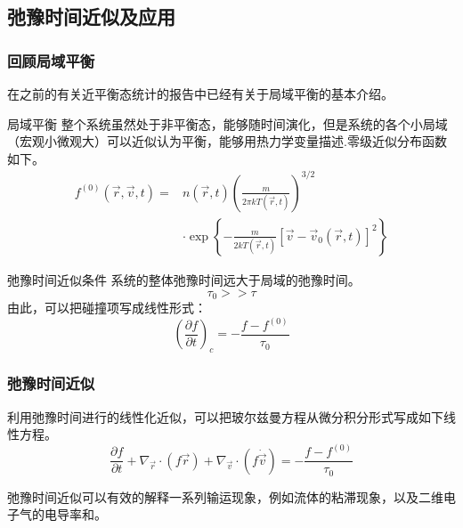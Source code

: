 \documentclass{if-beamer}
\begin{document}
\subsection{弛豫时间近似及应用}
\begin{frame}
    \frametitle{回顾局域平衡}
    在之前的有关近平衡态统计的报告中已经有关于局域平衡的基本介绍。
    \begin{block}
        {局域平衡}
        整个系统虽然处于非平衡态，能够随时间演化，但是系统的各个小局域（宏观小微观大）可以近似认为平衡，能够用热力学变量描述.零级近似分布函数如下。
        \begin{equation*}
        \begin{aligned} f^{(0)}(\vec{r}, \vec{v}, t)=& n(\vec{r}, t)\left(\frac{m}{2 \pi k T(\vec{r}, t)}\right)^{3 / 2} \\ & \cdot \exp \left\{-\frac{m}{2 k T(\vec{r}, t)}\left[\vec{v}-\vec{v}_{0}(\vec{r}, t)\right]^{2}\right\} \end{aligned}
        \end{equation*}
    \end{block}
    \begin{block}
        {弛豫时间近似条件}
        系统的整体弛豫时间远大于局域的弛豫时间。
        \begin{equation*}
            \tau_0>>\tau
        \end{equation*}
        由此，可以把碰撞项写成线性形式：
        \begin{equation*}
            \left(\frac{\partial f}{\partial t}\right)_{c}=-\frac{f-f^{(0)}}{\tau_{0}}
        \end{equation*}
    \end{block}
    
\end{frame}
\begin{frame}
    \frametitle{弛豫时间近似}
    
    \begin{block}{}
        利用弛豫时间进行的线性化近似，可以把玻尔兹曼方程从微分积分形式写成如下线性方程。
        \begin{equation*}
            \frac{\partial f}{\partial t}+\nabla_{\vec{r}} \cdot(f \vec{r})+\nabla_{\vec{v}} \cdot(f \dot{\vec{v}})=-\frac{f-f^{(0)}}{\tau_{0}}
        \end{equation*}
    \end{block}
        
    \begin{block}{}
        弛豫时间近似可以有效的解释一系列输运现象，例如流体的粘滞现象，以及二维电子气的电导率和\color{red}{热导率}。
    \end{block}
            
        
\end{frame}
\end{document}
